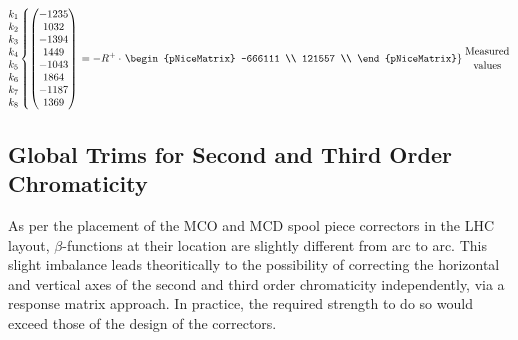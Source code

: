 \begin{equation}
    \begin{matrix}
      k_1 \\
      k_2 \\
      k_3 \\
      k_4 \\
      k_5 \\
      k_6 \\
      k_7 \\
      k_8 \\
    \end{matrix}
  \left\{
  \begin{pmatrix}
     -1235 \\
      1032   \\  
     -1394  \\ 
      1449   \\ 
     -1043  \\ 
      1864   \\ 
     -1187  \\ 
      1369   \\ 
  \end{pmatrix}
  \right.
  =
  -R^{+} 
  \cdot
  \left.
  \begin{pNiceMatrix}
      -666111 \\
      121557 \\
  \end{pNiceMatrix}
  \right\}
  {\text{Measured} \atop \text{values}}
  \label{eq:resp_matrix_inverse_example}
\end{equation}





\subsection{Global Trims for Second and Third Order Chromaticity}



As per the placement of the MCO and MCD spool piece correctors in the LHC layout, $\beta$-functions at their location are slightly different from arc to arc. This slight imbalance leads theoritically to the possibility of correcting the horizontal and vertical axes of the second and third order chromaticity independently, via a response matrix approach.
In practice, the required strength to do so would exceed those of the design of the correctors.

